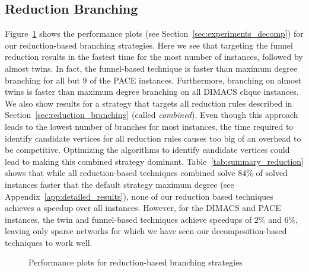 \documentclass[a4paper,UKenglish,cleveref, autoref, thm-restate]{lipics-v2021}
\begin{document}
\subsection{Reduction Branching}
Figure~\ref{fig:all_reduction} shows the performance plots (see
Section~\ref{sec:experiments_decomp}) for our reduction-based branching strategies. Here we see that targeting the funnel reduction
results in the fastest time for the most number of instances, followed by almost
twins. In fact, the
funnel-based technique is faster than maximum degree branching for all but 9 of the PACE instances. Furthermore, branching on almost
twins is faster than maximum degree branching on all DIMACS clique instances. We also show results for a strategy that targets all reduction rules
described in Section~\ref{sec:reduction_branching} (called \emph{combined}). Even though this approach
leads to the lowest number of branches for most instances, the time required to
identify candidate vertices for all reduction rules causes too big of an
overhead to be competitive. Optimizing the algorithms to identify candidate
vertices could lead to making this combined strategy
dominant. Table~\ref{tab:summary_reduction} shows that while all reduction-based
techniques combined solve $84\%$ of solved instances faster that the default
strategy maximum degree (see Appendix~\ref{app:detailed_results}), none of our
reduction based techniques achieves a speedup over all instances. However, for
the DIMACS and PACE instances, the twin and funnel-based techniques achieve
speedups of $2\%$ and $6\%$, leaving only sparse networks for which we have seen
our decomposition-based techniques to work well.



\begin{figure}[t!]
\begin{subfigure}[t!]{\textwidth}
	\centering
	
\end{subfigure}

\begin{subfigure}[t!]{\textwidth}
	\centering
	
\end{subfigure}
\caption{Performance plots for reduction-based branching strategies}\label{fig:all_reduction}
\end{figure}
\end{document}
